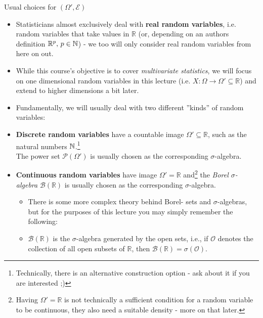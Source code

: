 \documentclass[a4,11pt]{beamer}
\newcommand{\R}{\mathbb{R}}
\newlength{\wideitemsep}
\let\olditem\item
\renewcommand{\item}{\setlength{\itemsep}{\wideitemsep}\olditem}
\begin{document}
\begin{frame}[allowframebreaks]{Usual choices for $(\Omega',\mathcal{E})$}
    \begin{itemize}
        \item Statisticians almost exclusively deal with \textbf{real random variables}, i.e. random variables that take values in $\R$ (or, depending on an authors definition $\R^p,\,p\in\N$) - we too will only consider real random variables from here on out.
        \item While this course's objective is to cover \emph{multivariate statistics}, we will focus on one dimensional random variables in this lecture (i.e. $X:\Omega\longrightarrow\Omega'\subseteq\R$) and extend to higher dimensions a bit later.
        \item Fundamentally, we will usually deal with two different ''kinds'' of random variables:\end{itemize}\pagebreak
        \begin{itemize}
            \item \textbf{Discrete random variables} have a countable image $\Omega'\subseteq\R$, such as the natural numbers $\mathbb{N}$.\footnote{Technically, there is an alternative construction option - ask about it if you are interested ;)}\smallskip \\
            The power set $\mathcal{P}(\Omega')$ is usually chosen as the corresponding $\sigma$-algebra.
            \item \textbf{Continuous random variables} have image $\Omega'=\R$ and\footnote{Having $\Omega'=\R$ is not technically a sufficient condition for a random variable to be continuous, they also need a suitable density - more on that later.} the \emph{Borel $\sigma$-algebra} $\mathcal{B}(\R)$ is usually chosen as the corresponding $\sigma$-algebra.\medskip\\\begin{itemize}
                \item There is some more complex theory behind Borel- sets and $\sigma$-algebras, but for the purposes of this lecture you may simply remember the following:\vspace{-.5cm}\\
                \item  $\mathcal{B}(\R)$ is the $\sigma$-algebra generated by the open sets, i.e., if $\mathcal{O}$ denotes the collection of all open subsets of $\R$, then $\mathcal{B}(\R)=\sigma(\mathcal{O})$.
            \end{itemize}
        \end{itemize}
    
\end{frame}
\end{document}
